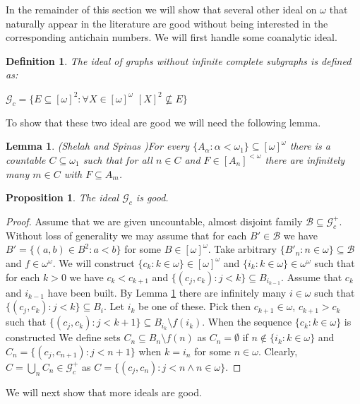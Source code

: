 \documentclass[a4paper]{amsart}
\newtheorem{lemma}[theorem]{Lemma}
\newtheorem{proposition}[theorem]{Proposition}
\newtheorem{definition}[theorem]{Definition}
\newcommand{\Baire}{\omega^{\omega}}
\begin{document}
In the remainder of this section we will show that several other ideal on $\omega$ that naturally appear in the literature are good without being interested in the corresponding antichain numbers. We will first handle some coanalytic ideal.
\begin{definition}
    The ideal of graphs without infinite complete subgraphs is defined as:
    \begin{center}
        $\mathcal{G}_{c}=\{E\subseteq[\omega]^{2}:\forall X\in[\omega]^{\omega}$ $[X]^{2}\nsubseteq E\}$
    \end{center}
\end{definition}
To show that these two ideal are good we will need the following lemma.
\begin{lemma}(Shelah and Spinas \cite{SpHein})\label{SHSP}
    For every $\{A_{\alpha}:\alpha<\omega_{1}\}\subseteq[\omega]^{\omega}$ there is a countable $C\subseteq\omega_{1}$ such that for all $n\in C$ and $ F\in[A_{n}]^{<\omega}$ there are infinitely many $m\in C$ with $F\subseteq A_{m}$.
\end{lemma}
\begin{proposition}
    The ideal $\mathcal{G}_{c}$ is good.
\end{proposition}
\begin{proof}
    Assume that we are given uncountable, almost disjoint family $\mathcal{B}\subseteq\mathcal{G}_{c}^{+}$. Without loss of generality we may assume that for each $B'\in\mathcal{B}$ we have $B'=\{(a,b)\in B^{2}:a<b\}$ for some $B\in[\omega]^{\omega}$. Take arbitrary $\{B'_{n}:n\in\omega\}\subseteq\mathcal{B}$ and $f\in\omega^{\omega}$. We will construct $\{c_{k}:k\in\omega\}\in[\omega]^{\omega}$ and $\{i_{k}:k\in\omega\}\in\Baire$ such that for each $k>0$ we have $c_{k}<c_{k+1}$ and $\{(c_{j},c_{k}):j<k\}\subseteq B_{i_{k-1}}$. Assume that $c_{k}$ and $i_{k-1}$ have been built. By Lemma \ref{SHSP} there are infinitely many $i\in\omega$ such that $\{(c_{j},c_{k}):j<k\}\subseteq B_{i}$. Let $i_{k}$ be one of these. Pick then $c_{k+1}\in\omega$, $c_{k+1}>c_{k}$ such that $\{(c_{j},c_{k}):j<k+1\}\subseteq B_{i_{k}}\setminus f(i_{k})$. When the sequence $\{c_{k}:k\in\omega\}$ is constructed We define sets $C_{n}\subseteq B_{n}\setminus f(n)$ as $C_{n}=\emptyset$ if $n\notin\{i_{k}:k\in\omega\}$ and $C_{n}=\{(c_{j},c_{n+1}):j<n+1\}$ when $k=i_{n}$ for some $n\in\omega$. Clearly, $C=\bigcup_{n}C_{n}\in\mathcal{G}_{c}^{+}$ as $C=\{(c_{j},c_{n}):j<n \land n\in\omega\}$.
\end{proof}
We will next show that more ideals are good.
\end{document}
